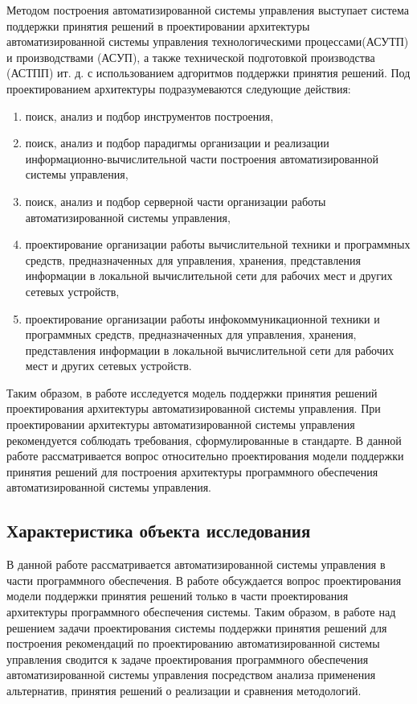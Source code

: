 Методом построения автоматизированной системы управления выступает система поддержки принятия решений в проектировании архитектуры автоматизированной системы управления технологическими процессами(АСУТП) и производствами (АСУП), а также технической подготовкой производства (АСТПП) ит. д. с использованием адгоритмов поддержки принятия решений.
Под проектированием архитектуры подразумеваются следующие действия:
\begin{enumerate}
    \item  поиск, анализ и подбор инструментов построения,
    \item  поиск, анализ и подбор парадигмы организации и реализации информационно-вычислительной части построения автоматизированной системы управления,
    \item  поиск, анализ и подбор серверной части организации работы автоматизированной системы управления,
    \item  проектирование организации работы  вычислительной техники и программных средств, предназначенных для управления, хранения, представления информации в локальной вычислительной сети для рабочих мест и других сетевых устройств,
    \item  проектирование организации работы инфокоммуникационной техники и программных средств, предназначенных для управления, хранения, представления информации в локальной вычислительной сети для рабочих мест и других сетевых устройств.
\end{enumerate}
Таким образом, в работе исследуется модель поддержки принятия решений проектирования архитектуры автоматизированной системы управления. 
При проектировании архитектуры автоматизированной системы управления рекомендуется соблюдать требования, сформулированные в стандарте\cite{ACSSt}.
В данной работе рассматривается вопрос относительно проектирования модели поддержки принятия решений для построения архитектуры программного обеспечения автоматизированной системы управления.

\subsection{Характеристика объекта исследования}\label{sec:ch1/sec2/sec2}
В данной работе рассматривается автоматизированной системы управления в части программного обеспечения. В работе обсуждается вопрос проектирования модели поддержки принятия решений только в части проектирования архитектуры программного обеспечения системы. 
Таким образом, в работе над решением задачи проектирования системы поддержки принятия решений для построения рекомендаций по проектированию автоматизированной системы управления сводится к задаче проектирования программного обеспечения автоматизированной системы управления посредством анализа применения альтернатив, принятия решений о реализации и сравнения методологий.

